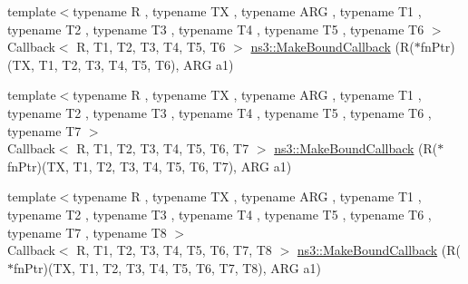\begin{DoxyCompactItemize}
\item 
{\footnotesize template$<$typename R , typename TX , typename A\+RG , typename T1 , typename T2 , typename T3 , typename T4 , typename T5 , typename T6 $>$ }\\Callback$<$ R, T1, T2, T3, T4, T5, T6 $>$ \hyperlink{group__makeboundcallback_ga544c994360d641347ecb1bfee199886d}{ns3\+::\+Make\+Bound\+Callback} (R($\ast$fn\+Ptr)(TX, T1, T2, T3, T4, T5, T6), A\+RG a1)
\item 
{\footnotesize template$<$typename R , typename TX , typename A\+RG , typename T1 , typename T2 , typename T3 , typename T4 , typename T5 , typename T6 , typename T7 $>$ }\\Callback$<$ R, T1, T2, T3, T4, T5, T6, T7 $>$ \hyperlink{group__makeboundcallback_gaab4503d8eedf9b9a58d611baa093ba38}{ns3\+::\+Make\+Bound\+Callback} (R($\ast$fn\+Ptr)(TX, T1, T2, T3, T4, T5, T6, T7), A\+RG a1)
\item 
{\footnotesize template$<$typename R , typename TX , typename A\+RG , typename T1 , typename T2 , typename T3 , typename T4 , typename T5 , typename T6 , typename T7 , typename T8 $>$ }\\Callback$<$ R, T1, T2, T3, T4, T5, T6, T7, T8 $>$ \hyperlink{group__makeboundcallback_ga0c1d4205bef343605370633dd9bd8f04}{ns3\+::\+Make\+Bound\+Callback} (R($\ast$fn\+Ptr)(TX, T1, T2, T3, T4, T5, T6, T7, T8), A\+RG a1)
\end{DoxyCompactItemize}
